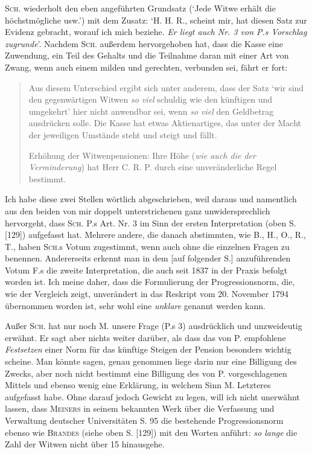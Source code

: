 \textsc{Sch.} wiederholt den eben angeführten Grundsatz (‘Jede Witwe erhält die höchstmögliche usw.’) mit dem Zusatz: ‘H. H. R., scheint mir, hat diesen Satz zur Evidenz gebracht, worauf ich mich beziehe. \textit{Er liegt auch Nr. 3 von P.s Vorschlag zugrunde}’. Nachdem \textsc{Sch.} außerdem hervorgehoben hat, dass die Kasse eine Zuwendung, ein Teil des Gehalts und die Teilnahme daran mit einer Art von Zwang, wenn auch einem milden und gerechten, verbunden sei, fährt er fort:
\begin{quote}
Aus diesem Unterschied ergibt sich unter anderem, dass der Satz ‘wir sind den gegenwärtigen Witwen \textit{so viel} schuldig wie den künftigen und umgekehrt’ hier nicht anwendbar sei, wenn \textit{so viel} den Geldbetrag ausdrücken solle. Die Kasse hat etwas Aktienartiges, das unter der Macht der jeweiligen Umstände steht und steigt und fällt.

Erhöhung der Witwenpensionen: Ihre Höhe (\textit{wie auch die der Verminderung}) hat Herr C. R. P. durch eine unveränderliche Regel bestimmt.
\end{quote}
\noindent Ich habe diese zwei Stellen wörtlich abgeschrieben, weil daraus und namentlich aus den beiden von mir doppelt unterstrichenen ganz unwidersprechlich hervorgeht, dass \textsc{Sch.} P.s Art. Nr. 3 im Sinn der ersten Interpretation (oben S. [129]) aufgefasst hat. Mehrere andere, die danach abstimmten, wie B., H., O., R., T., haben \textsc{Sch.}s Votum zugestimmt, wenn auch ohne die einzelnen Fragen zu benennen. Andererseits erkennt man in dem [auf folgender S.] anzuführenden Votum F.s die zweite Interpretation, die auch seit 1837 in der Praxis befolgt worden ist. Ich meine daher, dass die Formulierung der Progressionsnorm, die, wie der Vergleich zeigt, unverändert in das Reskript vom 20. November 1794 übernommen worden ist, sehr wohl eine \textit{unklare} genannt werden kann.

Außer \textsc{Sch.} hat nur noch M. unsere Frage (P.s 3) ausdrücklich und unzweideutig erwähnt. Er sagt aber nichts weiter darüber, als dass das von P. empfohlene \textit{Festsetzen} einer Norm für das künftige Steigen der Pension besonders wichtig scheine. Man könnte sagen, genau genommen liege darin nur eine Billigung des Zwecks, aber noch nicht bestimmt eine Billigung des von P. vorgeschlagenen Mittels und ebenso wenig eine Erklärung, in welchem Sinn M. Letzteres aufgefasst habe. Ohne darauf jedoch Gewicht zu legen, will ich nicht unerwähnt lassen, dass \textsc{Meiners} in seinem bekannten Werk über die Verfassung und Verwaltung deutscher Universitäten S. 95 die bestehende Progressionsnorm ebenso wie \textsc{Brandes} (siehe oben S. [129]) mit den Worten anführt: \textit{so lange} die Zahl der Witwen nicht über 15 hinausgehe.


